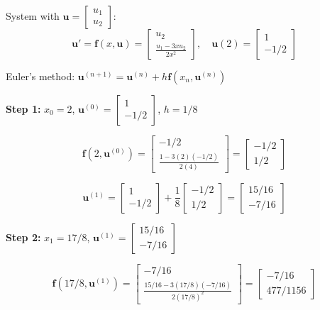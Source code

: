 \documentclass[reqno, answers]{exam}
\begin{document}
\begin{enumerate}
\begin{solution}
\begin{parts}
System with $\mathbf{u} = \begin{bmatrix} u_1 \\ u_2 \end{bmatrix}$:
$$\mathbf{u}' = \mathbf{f}(x, \mathbf{u}) = \begin{bmatrix} u_2 \\ \frac{u_1 - 3xu_2}{2x^2} \end{bmatrix}, \quad \mathbf{u}(2) = \begin{bmatrix} 1 \\ -1/2 \end{bmatrix}$$

Euler's method: $\mathbf{u}^{(n+1)} = \mathbf{u}^{(n)} + h\mathbf{f}(x_n, \mathbf{u}^{(n)})$

\textbf{Step 1:} $x_0 = 2$, $\mathbf{u}^{(0)} = \begin{bmatrix} 1 \\ -1/2 \end{bmatrix}$, $h = 1/8$

$$\mathbf{f}(2, \mathbf{u}^{(0)}) = \begin{bmatrix} -1/2 \\ \frac{1 - 3(2)(-1/2)}{2(4)} \end{bmatrix} = \begin{bmatrix} -1/2 \\ 1/2 \end{bmatrix}$$

$$\mathbf{u}^{(1)} = \begin{bmatrix} 1 \\ -1/2 \end{bmatrix} + \frac{1}{8}\begin{bmatrix} -1/2 \\ 1/2 \end{bmatrix} = \begin{bmatrix} 15/16 \\ -7/16 \end{bmatrix}$$

\textbf{Step 2:} $x_1 = 17/8$, $\mathbf{u}^{(1)} = \begin{bmatrix} 15/16 \\ -7/16 \end{bmatrix}$

$$\mathbf{f}(17/8, \mathbf{u}^{(1)}) = \begin{bmatrix} -7/16 \\ \frac{15/16 - 3(17/8)(-7/16)}{2(17/8)^2} \end{bmatrix} = \begin{bmatrix} -7/16 \\ 477/1156 \end{bmatrix}$$


\end{parts}
\end{solution}
\end{enumerate}
\end{document}
